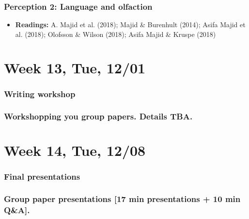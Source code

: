 \documentclass[11pt,man]{article}
\providecommand{\tightlist}{%
  \setlength{\itemsep}{0pt}\setlength{\parskip}{0pt}}
\begin{document}
\hypertarget{perception-2-language-and-olfaction}{%
\subsubsection{Perception 2: Language and
olfaction}\label{perception-2-language-and-olfaction}}

\begin{itemize}
\tightlist
\item
  \textbf{Readings:} A. Majid et al. (2018); Majid \& Burenhult (2014);
  Asifa Majid et al. (2018); Olofsson \& Wilson (2018); Asifa Majid \&
  Kruspe (2018)
\end{itemize}

\hypertarget{week-13-tue-1201}{%
\section{Week 13, Tue, 12/01}\label{week-13-tue-1201}}

\hypertarget{writing-workshop}{%
\subsubsection{Writing workshop}\label{writing-workshop}}

\hypertarget{workshopping-you-group-papers.-details-tba.}{%
\subsubsection{Workshopping you group papers. Details
TBA.}\label{workshopping-you-group-papers.-details-tba.}}

\hypertarget{week-14-tue-1208}{%
\section{Week 14, Tue, 12/08}\label{week-14-tue-1208}}

\hypertarget{final-presentations}{%
\subsubsection{Final presentations}\label{final-presentations}}

\hypertarget{group-paper-presentations-17-min-presentations-10-min-qa.}{%
\subsubsection{Group paper presentations {[}17 min presentations + 10
min
Q\&A{]}.}\label{group-paper-presentations-17-min-presentations-10-min-qa.}}
\end{document}
